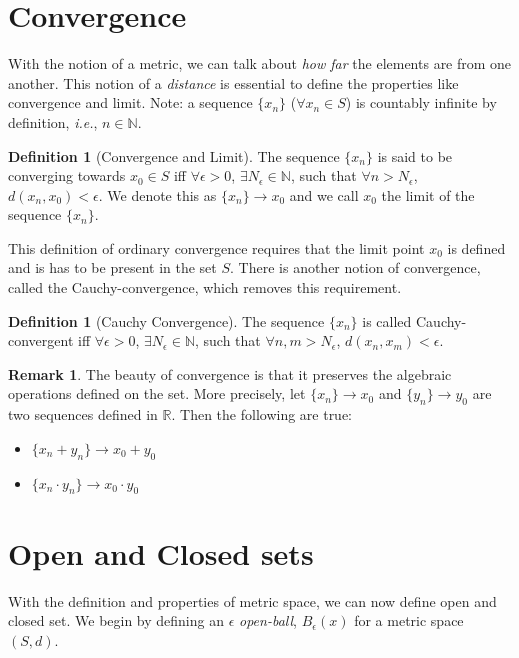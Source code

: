 \documentclass{report}
\theoremstyle{plain}
\theoremstyle{definition}
\newtheorem{definition}[theorem]{Definition} %
\newtheorem{remark}[theorem]{Remark} %
\begin{document}
\section{Convergence}
\noindent With the notion of a metric, we can talk about \emph{how far} the elements are from one another. This notion of a \emph{distance} is essential to define the properties like convergence and limit. Note: a sequence $\{x_n\}$ ($\forall x_n\in S$) is countably infinite by definition, \emph{i.e.}, $n\in\mathbb{N}$.
\begin{definition}[Convergence and Limit]
The sequence $\{x_n\}$ is said to be converging towards $x_0\in S$ iff $\forall\epsilon>0$, $\exists N_\epsilon\in\mathbb{N}$, such that $\forall n >N_\epsilon$, $d(x_n, x_0) < \epsilon$. We denote this as $\{x_n\}\rightarrow x_0$ and we call $x_0$ the limit of the sequence $\{x_n\}$.
\end{definition}
\noindent This definition of ordinary convergence requires that the limit point $x_0$ is defined and is has to be present in the set $S$. There is another notion of convergence, called the Cauchy-convergence, which removes this requirement.
\begin{definition}[Cauchy Convergence]
The sequence $\{x_n\}$ is called Cauchy-convergent iff $\forall\epsilon>0$, $\exists N_\epsilon\in\mathbb{N}$, such that $\forall n,m >N_\epsilon$, $d(x_n, x_m) < \epsilon$.
\end{definition}
\begin{remark}
The beauty of convergence is that it preserves the algebraic operations defined on the set. More precisely, let $\{x_n\}\rightarrow x_0$ and $\{y_n\}\rightarrow y_0$ are two sequences defined in $\mathbb{R}$. Then the following are true:
\begin{itemize}
\item[(a)] $\{x_n+y_n\}\rightarrow x_0+y_0$
\item[(b)] $\{x_n\cdot y_n\}\rightarrow x_0\cdot y_0$
\end{itemize}
\end{remark}
\section{Open and Closed sets}
\noindent With the definition and properties of metric space, we can now define open and closed set. We begin by defining an $\epsilon$ \emph{open-ball}, $B_\epsilon(x)$ for a metric space $(S, d)$.
\end{document}
